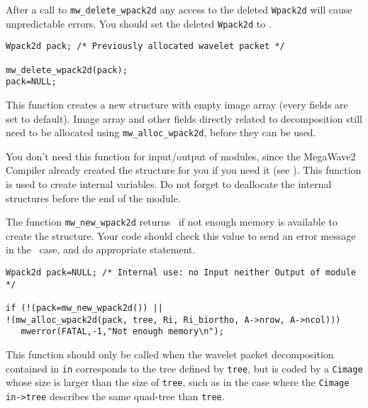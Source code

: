 After a call to \verb+mw_delete_wpack2d+ any access to the deleted
\verb+Wpack2d+ will cause unpredictable errors. You should set the
deleted \verb+Wpack2d+ to \Null.

\Next
\Example
\begin{verbatim}
Wpack2d pack; /* Previously allocated wavelet packet */

mw_delete_wpack2d(pack);
pack=NULL;
\end{verbatim}


\newpage %

\Description
This function creates a new \wpackdd structure with empty image array
(every fields are set to default). Image array and other fields directly
related to decomposition still need to be allocated using
\verb+mw_alloc_wpack2d+, before they can be used.

You don't need this function for input/output of modules, since the MegaWave2
Compiler already created the structure for you if you need it (see \volI). 
This function is used to create internal variables.
Do not forget to deallocate the internal structures before the end
of the module.

The function \verb+mw_new_wpack2d+ returns \Null\ if not enough memory is available 
to create the structure. Your code should check this value to send an
error message in the \Null\ case, and do appropriate statement.

\Next
\Example
\begin{verbatim}
Wpack2d pack=NULL; /* Internal use: no Input neither Output of module */

if (!(pack=mw_new_wpack2d()) ||
!(mw_alloc_wpack2d(pack, tree, Ri, Ri_biortho, A->nrow, A->ncol)))
   mwerror(FATAL,-1,"Not enough memory\n");
\end{verbatim}

\newpage %


\Description
This function should only be called when the wavelet packet decomposition
contained in \verb+in+ corresponds to the tree defined by \verb+tree+, but is coded
by a \verb+Cimage+ whose size is larger than the size of \verb+tree+, 
such as in the case where the \verb+Cimage+ \verb+in->tree+ describes the same quad-tree 
than \verb+tree+.

